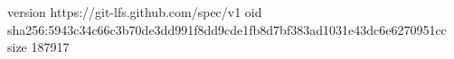 version https://git-lfs.github.com/spec/v1
oid sha256:5943c34c66c3b70de3dd991f8dd9cde1fb8d7bf383ad1031e43dc6e6270951cc
size 187917
